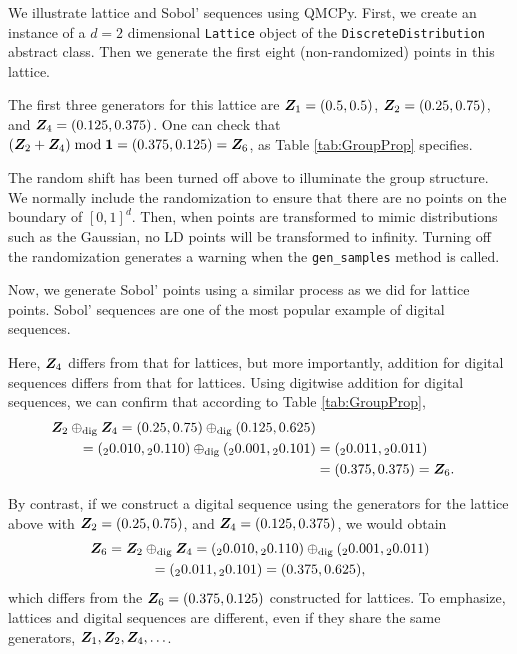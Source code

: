 \documentclass[graybox,footinfo]{svmult}
\newcommand{\dig}{\textup{dig}}
\begin{document}
We illustrate lattice and Sobol' sequences using QMCPy. First, we create an instance of a $d=2$ dimensional \texttt{Lattice} object of the  \texttt{DiscreteDistribution} abstract class. Then we generate the first eight (non-randomized) points in this lattice. 

The first three generators for this lattice are ${\boldsymbol{Z}}_1 = (0.5, 0.5)$, ${\boldsymbol{Z}}_2 = (0.25, 0.75)$, and ${\boldsymbol{Z}}_4 = (0.125, 0.375)$.  One can check that $({\boldsymbol{Z}}_2 + {\boldsymbol{Z}}_4) \bmod {\boldsymbol{1}} = (0.375, 0.125) = {\boldsymbol{Z}}_6$, as Table \ref{tab:GroupProp} specifies.

The random shift has been turned off above to illuminate the group structure.  We normally include the randomization to ensure that there are no points on the boundary of $[0,1]^d$.  Then, when points are transformed to mimic distributions such as the Gaussian, no LD points will be transformed to infinity.  Turning off the randomization generates a warning when the \texttt{gen\_samples} method is called.

Now, we generate Sobol' points using a similar process as we did for lattice points.  Sobol' sequences are one of the most popular example of digital sequences.

Here, ${\boldsymbol{Z}}_4$ differs from that for lattices, but more importantly, addition for digital sequences differs from that for lattices.  Using digitwise addition for digital sequences, we can confirm that according to Table \ref{tab:GroupProp},
\begin{align*}
\bsZ_2 \oplus_{\dig} \bsZ_4 = (0.25,0.75)  \oplus_{\dig} (0.125,0.625) \\
=  ({}_20.010,{}_20.110)  \oplus_{\dig} ({}_20.001,{}_20.101) &= ({}_20.011,{}_20.011) \\
& = (0.375,0.375) = \bsZ_6.
\end{align*}

By contrast, if we construct a digital sequence using the generators for the lattice above with ${\boldsymbol{Z}}_2 = (0.25, 0.75)$, and ${\boldsymbol{Z}}_4 = (0.125, 0.375)$, we would obtain
\begin{multline*}
\bsZ_6 = \bsZ_2 \oplus_{\dig} \bsZ_4   = ({}_20.010,{}_20.110)  \oplus_{\dig} ({}_20.001,{}_20.011)  \\
= ({}_20.011,{}_20.101) = (0.375, 0.625),
\end{multline*}
which differs from the ${\boldsymbol{Z}}_6=(0.375, 0.125)$ constructed for lattices.  To emphasize, lattices and digital sequences are different, even if they share the same generators, ${\boldsymbol{Z}}_1, {\boldsymbol{Z}}_2, {\boldsymbol{Z}}_4, \ldots$.
\end{document}

